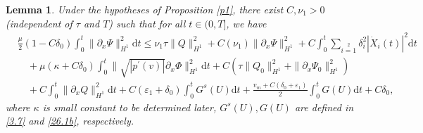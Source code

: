 \documentclass[10pt,reqno]{amsart}
\numberwithin{equation}{section}
\newtheorem{lemma}[theorem]{Lemma}
\newcommand{\dif}{\mathrm{d}}
\begin{document}
\begin{lemma}\label{Le4.9}
Under the hypotheses of Proposition \ref{p1}, there exist $C,\nu_1>0$ (independent of $\tau$ and $T$) such that for all $t\in(0,T]$, we have
\begin{equation}\label{26.4}
\begin{aligned}
&\frac{\mu}{2}(1-C\delta_0)\int_0^t\|\partial_{x}\Psi\|_{H^1}^2\dif t
\leq\nu_1\tau\|Q\|_{H^1}^2
+C(\nu_1)\|\partial_{x}\Psi\|_{H^1}^2
     +C\int_0^t\sum\limits_{i=1}\limits^2\delta_i^2|\dot{X}_i(t)|^2\dif t\\
     &\quad+\mu(\kappa+C\delta_0)\int_0^t\|\sqrt{|p^\prime(v)|}\partial_{x}\Phi\|_{H^1}^2\dif t
     +C\left(\tau\|Q_0\|_{H^1}^2+\|\partial_{x}\Psi_0\|_{H^1}^2\right)\\
&\quad+C\int_0^t\|\partial_{x}Q\|_{H^1}^2\dif t+C(\varepsilon_1+\delta_0)\int_0^t G^s(U)\dif t
+\frac{v_m+C(\delta_0+\varepsilon_1)}{2}\int_0^t G(U)\dif t+C\delta_0,
\end{aligned}
\end{equation}
where $\kappa$ is small constant to be determined later, $G^s(U), G(U)$ are defined in \eqref{3.7} and \eqref{26.1b}, respectively.
\end{lemma}
\end{document}
